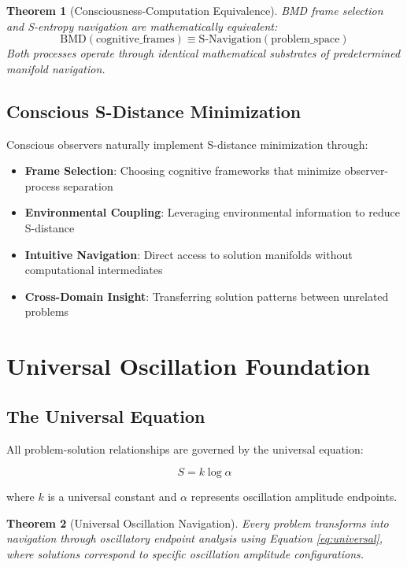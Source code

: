\documentclass[11pt]{article}
\newtheorem{theorem}{Theorem}[section]
\theoremstyle{definition}
\theoremstyle{remark}
\begin{document}
\begin{theorem}[Consciousness-Computation Equivalence]
BMD frame selection and S-entropy navigation are mathematically equivalent:
\begin{equation}
\text{BMD}(\text{cognitive\_frames}) \equiv \text{S-Navigation}(\text{problem\_space})
\end{equation}
Both processes operate through identical mathematical substrates of predetermined manifold navigation.
\end{theorem}

\subsection{Conscious S-Distance Minimization}

Conscious observers naturally implement S-distance minimization through:

\begin{itemize}
\item \textbf{Frame Selection}: Choosing cognitive frameworks that minimize observer-process separation
\item \textbf{Environmental Coupling}: Leveraging environmental information to reduce S-distance  
\item \textbf{Intuitive Navigation}: Direct access to solution manifolds without computational intermediates
\item \textbf{Cross-Domain Insight}: Transferring solution patterns between unrelated problems
\end{itemize}

\section{Universal Oscillation Foundation}

\subsection{The Universal Equation}

All problem-solution relationships are governed by the universal equation:

\begin{equation}
S = k \log \alpha
\label{eq:universal}
\end{equation}

where $k$ is a universal constant and $\alpha$ represents oscillation amplitude endpoints.

\begin{theorem}[Universal Oscillation Navigation]
Every problem transforms into navigation through oscillatory endpoint analysis using Equation \ref{eq:universal}, where solutions correspond to specific oscillation amplitude configurations.
\end{theorem}
\end{document}
